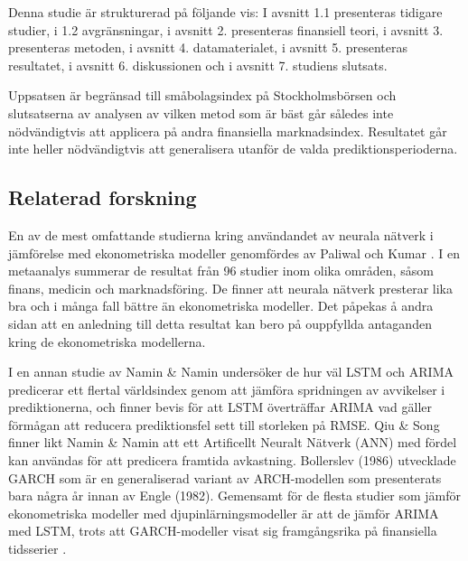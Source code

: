 \documentclass[11pt]{article}
\numberwithin{equation}{section}
\numberwithin{table}{section}
\numberwithin{figure}{section}
\begin{document}
Denna studie är strukturerad på följande vis: I avsnitt 1.1 presenteras tidigare studier, i 1.2 avgränsningar, i avsnitt 2. presenteras finansiell teori, i avsnitt 3. presenteras metoden, i avsnitt 4. datamaterialet, i avsnitt 5. presenteras resultatet, i avsnitt 6. diskussionen och i avsnitt 7. studiens slutsats.

Uppsatsen är begränsad till småbolagsindex på Stockholmsbörsen och slutsatserna av analysen av vilken metod som är bäst går således inte nödvändigtvis att applicera på andra finansiella marknadsindex. Resultatet går inte heller nödvändigtvis att generalisera utanför de valda prediktionsperioderna.




\subsection{Relaterad forskning}

En av de mest omfattande studierna kring användandet av neurala nätverk i jämförelse med ekonometriska modeller genomfördes av Paliwal och Kumar \parencite*{paliwal2009neural}. I en metaanalys summerar de resultat från 96 studier inom olika områden, såsom finans, medicin och marknadsföring. De finner att neurala nätverk presterar lika bra och i många fall bättre än ekonometriska modeller. Det påpekas å andra sidan att en anledning till detta resultat kan bero på ouppfyllda antaganden kring de ekonometriska modellerna. 

I en annan studie av Namin \& Namin \parencite*{siaminamini2018forecasting} undersöker de hur väl LSTM och ARIMA predicerar ett flertal världsindex genom att jämföra spridningen av avvikelser i prediktionerna, och finner bevis för att LSTM överträffar ARIMA vad gäller förmågan att reducera prediktionsfel sett till storleken på RMSE. Qiu \& Song \parencite*{10.1371/journal.pone.0155133} finner likt Namin \& Namin \parencite*{siaminamini2018forecasting} att ett Artificellt Neuralt Nätverk (ANN) med fördel kan användas för att predicera framtida avkastning. Bollerslev (1986) utvecklade GARCH som är en generaliserad variant av ARCH-modellen som presenterats bara några år innan av Engle (1982). Gemensamt för de flesta studier som jämför ekonometriska modeller med djupinlärningsmodeller är att de jämför ARIMA med LSTM, trots att GARCH-modeller visat sig framgångsrika på finansiella tidsserier \parencite{garch}.
\end{document}
